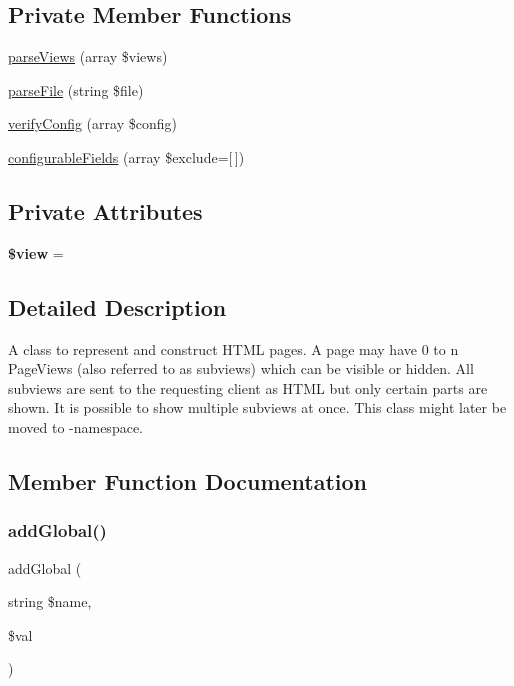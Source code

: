 \subsection*{Private Member Functions}
\begin{DoxyCompactItemize}
\item 
\hyperlink{class_lora_1_1_page_a49b28f2ca7604e14af0d5829b4e8cc4a}{parse\+Views} (array \$views)
\item 
\hyperlink{class_lora_1_1_page_a63ba1656485acf76a0d23e8f64fdfa1d}{parse\+File} (string \$file)
\item 
\hyperlink{class_lora_1_1_page_a163d90b496da60a48073aa5d127922ed}{verify\+Config} (array \$config)
\item 
\hyperlink{class_lora_1_1_page_a3b38056ae9a3c2cada8000895f46b9cb}{configurable\+Fields} (array \$exclude=\mbox{[}$\,$\mbox{]})
\end{DoxyCompactItemize}
\subsection*{Private Attributes}
\begin{DoxyCompactItemize}
\item 
\mbox{\label{class_lora_1_1_page_acccf2eac8663e0cebe8101e90fbab089}} 
{\bfseries \$view} = \textquotesingle{}\textquotesingle{}
\end{DoxyCompactItemize}


\subsection{Detailed Description}
A class to represent and construct H\+T\+ML pages. A page may have 0 to n Page\+Views (also referred to as subviews) which can be visible or hidden. All subviews are sent to the requesting client as H\+T\+ML but only certain parts are shown. It is possible to show multiple subviews at once. This class might later be moved to  -\/namespace. 

\subsection{Member Function Documentation}
\mbox{\label{class_lora_1_1_page_a7fab10802dd45ee18ac432c3ad597eb5}} 
\subsubsection{\texorpdfstring{add\+Global()}{addGlobal()}}
{\footnotesize\ttfamily add\+Global (\begin{DoxyParamCaption}\item[{string}]{\$name,  }\item[{}]{\$val }\end{DoxyParamCaption})}

